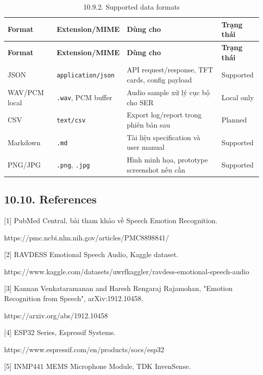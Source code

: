 \documentclass[12pt,a4paper]{article}
\begin{document}
\begin{center}
\scriptsize
\begin{longtable}{|P{0.18\textwidth}|P{0.25\textwidth}|P{0.25\textwidth}|P{0.22\textwidth}|}
\caption{10.9.2. Supported data formats}\\
\hline
\textbf{Format} & \textbf{Extension/MIME} & \textbf{Dùng cho} & \textbf{Trạng thái} \\
\hline
\endfirsthead
\hline
\textbf{Format} & \textbf{Extension/MIME} & \textbf{Dùng cho} & \textbf{Trạng thái} \\
\hline
\endhead
JSON & \texttt{application/json} & API request/response, TFT cards, config payload & Supported \\
\hline
WAV/PCM local & \texttt{.wav}, PCM buffer & Audio sample xử lý cục bộ cho SER & Local only \\
\hline
CSV & \texttt{text/csv} & Export log/report trong phiên bản sau & Planned \\
\hline
Markdown & \texttt{.md} & Tài liệu specification và user manual & Supported \\
\hline
PNG/JPG & \texttt{.png}, \texttt{.jpg} & Hình minh họa, prototype screenshot nếu cần & Supported \\
\hline
\end{longtable}
\setlength{\tabcolsep}{6pt}
\normalsize
\end{center}

\subsection*{10.10. References}

[1] PubMed Central, bài tham khảo về Speech Emotion Recognition.

https://pmc.ncbi.nlm.nih.gov/articles/PMC8898841/


[2] RAVDESS Emotional Speech Audio, Kaggle dataset.

https://www.kaggle.com/datasets/uwrfkaggler/ravdess-emotional-speech-audio


[3] Kannan Venkataramanan and Haresh Rengaraj Rajamohan, "Emotion Recognition from Speech", arXiv:1912.10458.

https://arxiv.org/abs/1912.10458


[4] ESP32 Series, Espressif Systems.

https://www.espressif.com/en/products/socs/esp32


[5] INMP441 MEMS Microphone Module, TDK InvenSense.
\end{document}
